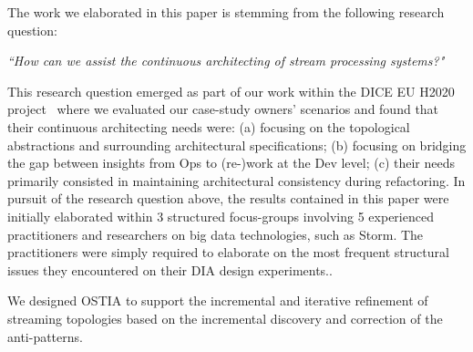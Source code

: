 
The work we elaborated in this paper is stemming from the following research question:

\begin{center}
\emph{``How can we assist the continuous architecting of stream processing systems?"}
\end{center}

This research question emerged as part of our work within the DICE EU H2020 project~\cite{dice2020}
where we evaluated our case-study owners' scenarios and found that their continuous architecting needs were: (a) focusing on the topological abstractions and surrounding architectural specifications; (b) focusing on bridging the gap between insights from Ops to (re-)work at the Dev level; (c) their needs primarily consisted in maintaining architectural consistency during refactoring.
In pursuit of the research question above, the results contained in this paper were initially elaborated within 3 structured focus-groups \cite{focusgroup} involving 5 experienced practitioners and researchers on big data technologies, such as Storm. The practitioners were simply required to elaborate on the most frequent structural issues they encountered on their DIA design experiments..

We designed OSTIA
to support the incremental and iterative refinement of streaming topologies based on the incremental discovery and correction of the anti-patterns.

